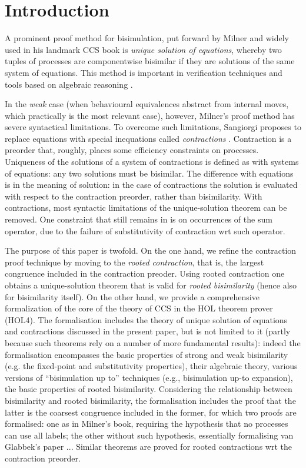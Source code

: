 


\section{Introduction}

A prominent proof method for bisimulation, put forward by Milner and widely used in his
 landmark  CCS book \cite{Mil89}
is
\emph{unique solution of equations}, whereby two tuples of processes are
componentwise bisimilar if they are solutions 
of the same system of equations.
This method  is important in verification techniques and tools
  based on 
algebraic      reasoning \cite{theoryAndPractice,RosUnder10,BaeBOOK}. 

In the   \emph{weak} case (when  behavioural equivalences abstract from internal moves,
which practically is the most relevant case), however, 
Milner's proof method has severe syntactical limitations. 
To overcome such limitations, Sangiorgi proposes to replace
equations with  special inequations called
\emph{contractions} \cite{...}. Contraction is a preorder that, roughly, places some efficiency
constraints on processes.  
Uniqueness of the solutions 
 of a system of contractions
 is defined as with systems of
equations:  
any two solutions must be bisimilar.
The difference with equations is in the meaning of solution:
in the case of contractions
the solution is evaluated with respect to
the contraction preorder, rather than bisimilarity. 
With contractions, most syntactic limitations of the unique-solution theorem can be
removed.  One constraint that still remains in \cite{San...} is on occurrences of the sum operator, due to
the failure of substitutivity of contraction wrt such operator.  

The purpose of this paper is twofold. 
On the one hand, we refine the contraction proof technique by moving to the 
\emph{rooted contraction}, that is, the largest congruence included in the contraction
preoder.  Using rooted contraction one obtains a unique-solution theorem that is valid for
\emph{rooted bisimilarity} (hence also for bisimilarity itself).  
On the other hand, we provide a  
 comprehensive formalization  of the core of the theory of CCS 
 in the HOL
theorem prover (HOL4). The formalisation  includes the theory of unique solution of equations and
contractions discussed in the present paper, but is not limited to it (partly because such
theorems rely on a number of more fundamental results):
indeed the formalisation encompasses the basic properties of strong and weak
bisimilarity (e.g. the fixed-point and substitutivity properties), 
their algebraic theory, 
 various
versions of ``bisimulation up to'' techniques (e.g., bisimulation up-to expansion),
the basic properties  of rooted bisimilarity. Considering the relationship between bisimilarity and rooted
bisimilarity, the formalisation includes the proof that the latter is the coarsest
congruence included in the former, for which two proofs are formalised: one as in Milner's
book,  requiring the hypothesis that  no processes can use all labels; the other without
such hypothesis, essentially formalising van Glabbek's paper ...
Similar theorems are proved for rooted contractions wrt the contraction preorder. 



